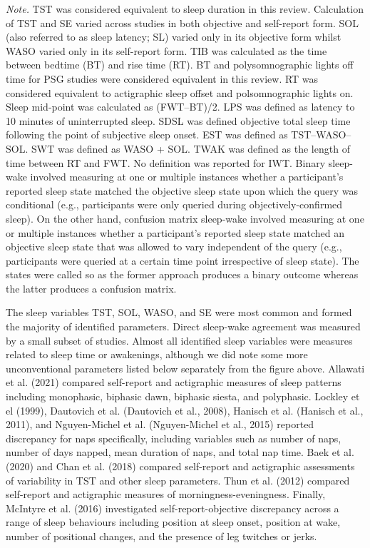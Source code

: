 \documentclass[
]{article}
\begin{document}
\emph{Note.} TST was considered equivalent to sleep duration in this review. Calculation of TST and SE varied across studies in both objective and self-report form. SOL (also referred to as sleep latency; SL) varied only in its objective form whilst WASO varied only in its self-report form. TIB was calculated as the time between bedtime (BT) and rise time (RT). BT and polysomnographic lights off time for PSG studies were considered equivalent in this review. RT was considered equivalent to actigraphic sleep offset and polsomnographic lights on. Sleep mid-point was calculated as (FWT--BT)/2. LPS was defined as latency to 10 minutes of uninterrupted sleep. SDSL was defined objective total sleep time following the point of subjective sleep onset. EST was defined as TST--WASO--SOL. SWT was defined as WASO + SOL. TWAK was defined as the length of time between RT and FWT. No definition was reported for IWT. Binary sleep-wake involved measuring at one or multiple instances whether a participant's reported sleep state matched the objective sleep state upon which the query
was conditional (e.g., participants were only queried during objectively-confirmed sleep). On the other hand, confusion matrix sleep-wake involved measuring at one or multiple
instances whether a participant's reported sleep state matched an objective sleep state that was allowed to vary independent of the query (e.g., participants were queried at a certain
time point irrespective of sleep state). The states were called so as the former approach produces a binary outcome whereas the latter produces a confusion matrix.

The sleep variables TST, SOL, WASO, and SE were most common and formed the majority of identified parameters. Direct sleep-wake agreement was measured by a small subset of studies. Almost all identified sleep variables were measures related to sleep time or awakenings, although we did note some more unconventional parameters listed below separately from the figure above. Allawati et al. (2021) compared self-report and actigraphic measures of sleep patterns including monophasic, biphasic dawn, biphasic siesta, and polyphasic. Lockley et el (1999), Dautovich et al. (Dautovich et al., 2008), Hanisch et al. (Hanisch et al., 2011), and Nguyen-Michel et al. (Nguyen-Michel et al., 2015) reported discrepancy for naps specifically, including variables such as number of naps, number of days napped, mean duration of naps, and total nap time. Baek et al. (2020) and Chan et al. (2018) compared self-report and actigraphic assessments of variability in TST and other sleep parameters. Thun et al. (2012) compared self-report and actigraphic measures of morningness-eveningness. Finally, McIntyre et al. (2016) investigated self-report-objective discrepancy across a range of sleep behaviours including position at sleep onset, position at wake, number of positional changes, and the presence of leg twitches or jerks.
\end{document}
